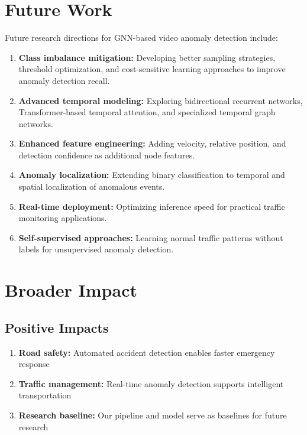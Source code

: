 \section{Future Work}

Future research directions for GNN-based video anomaly detection include:

\begin{enumerate}
    \item \textbf{Class imbalance mitigation:} Developing better sampling strategies, threshold optimization, and cost-sensitive learning approaches to improve anomaly detection recall.
    
    \item \textbf{Advanced temporal modeling:} Exploring bidirectional recurrent networks, Transformer-based temporal attention, and specialized temporal graph networks.
    
    \item \textbf{Enhanced feature engineering:} Adding velocity, relative position, and detection confidence as additional node features.
    
    \item \textbf{Anomaly localization:} Extending binary classification to temporal and spatial localization of anomalous events.
    
    \item \textbf{Real-time deployment:} Optimizing inference speed for practical traffic monitoring applications.
    
    \item \textbf{Self-supervised approaches:} Learning normal traffic patterns without labels for unsupervised anomaly detection.
\end{enumerate}

\section{Broader Impact}

\subsection{Positive Impacts}

\begin{enumerate}
    \item \textbf{Road safety:} Automated accident detection enables faster emergency response
    \item \textbf{Traffic management:} Real-time anomaly detection supports intelligent transportation
    \item \textbf{Research baseline:} Our pipeline and model serve as baselines for future research
\end{enumerate}

